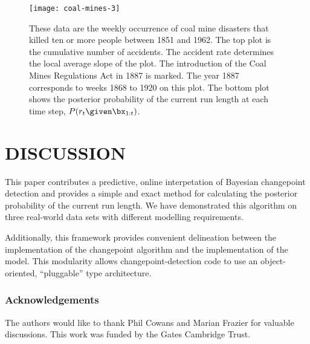 \documentclass[]{article}
\begin{document}
      \begin{figure*}[t]
	\centering
	\texttt{[image: coal-mines-3]}
	\vskip -0.4cm
	\caption{These data are the weekly occurrence of coal mine
	disasters that killed ten or more people between 1851 and 1962.
	The top plot is the cumulative number of accidents.  The accident
	rate determines the local average slope of the plot.  The
	introduction of the Coal Mines Regulations Act in 1887 is marked.
	The year 1887 corresponds to weeks 1868 to 1920 on this plot.  The
	bottom plot shows the posterior probability of the current run
	length at each time step, $P(r_{t}\given \bx_{1:t})$.}
	\label{fig:coal-mines}
      \end{figure*}

  \section{DISCUSSION}
    This paper contributes a predictive, online interpetation of Bayesian
    changepoint detection and provides a simple and exact method for
    calculating the posterior probability of the current run length.  We
    have demonstrated this algorithm on three real-world data sets with
    different modelling requirements.

    Additionally, this framework provides convenient delineation between
    the implementation of the changepoint algorithm and the implementation
    of the model.  This modularity allows changepoint-detection code to use
    an object-oriented, ``pluggable'' type architecture.
    
  \subsubsection*{Acknowledgements}
    The authors would like to thank Phil Cowans and Marian Frazier for
    valuable discussions.  This work was funded by the Gates Cambridge
    Trust.

  
  
  
\end{document}
